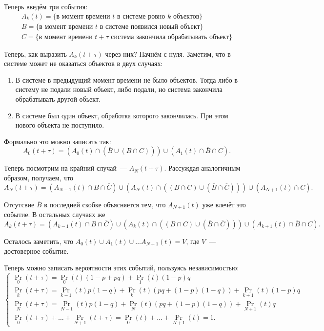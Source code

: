 Теперь введём три события:
\begin{gather}
	A_{k}(t) = \{\text{в момент времени } t \text{ в системе ровно } k \text{ 
	объектов}\} \\
	B = \{\text{в момент времени } t \text{ в системе появился новый объект}\} 
	\\
	C = \{\text{в момент времени } t + \tau \text{ система закончила 
	обрабатывать объект}\}
\end{gather}

Теперь, как выразить \(A_{k}(t + \tau)\) через них? Начнём с нуля. Заметим, что 
в системе может не оказаться объектов в двух случаях:
\begin{enumerate}
	\item В системе в предыдущий момент времени не было объектов. Тогда либо в 
	систему не подали новый объект, либо подали, но система закончила 
	обрабатывать другой обьект.
	\item В системе был один объект, обработка которого закончилась. При этом 
	нового объекта не поступило.
\end{enumerate} 
Формально это можно записать так:
\[
	A_{0}(t + \tau) = (A_{0}(t) \cap (\overline{B} \cup (B \cap C))) \cup 
	(A_{1}(t) \cap \overline{B} \cap C).
\]

Теперь посмотрим на крайний случай~--- \(A_{N}(t + \tau)\). Рассуждая 
аналогичным образом, получаем, что
\[
	A_{N}(t + \tau) = (A_{N - 1}(t) \cap B \cap \overline{C}) \cup (A_{N}(t) 
	\cap ((B \cap C) \cup (\overline{B} \cap \overline{C}))) \cup (A_{N + 1}(t) 
	\cap C).
\]

Отсутсвие \(\overline{B}\) в последней скобке объясняется тем, что \(A_{N + 
1}(t)\) уже влечёт это событие. В остальных случаях же
\[
	A_{k}(t + \tau) = (A_{k - 1}(t) \cap B \cap \overline{C}) \cup (A_{k}(t) 
	\cap ((B \cap C) \cup (\overline{B} \cap \overline{C}))) \cup (A_{k + 1}(t) 
	\cap \overline{B} \cap C).
\]

Осталось заметить, что \(A_{0}(t) \cup A_{1}(t) \cup \ldots A_{N + 1}(t) = V\), 
где \(V\)~--- достоверное событие.

Теперь можно записать вероятности этих событий, пользуясь независимостью:
\[
	\begin{cases}
	\Pr_{0}(t + \tau) = \Pr_{0}(t)(1 - p + pq) + \Pr_{1}(t)(1 - p)q \\
	\Pr_{k}(t + \tau) = \Pr_{k - 1}(t)p(1 - q) + \Pr_{k}(t)(pq + (1 - p)(1 - 
	q)) + \Pr_{k + 1}(t)(1 - p)q \\
	\Pr_{N}(t + \tau) = \Pr_{N - 1}(t)p(1 - q) + \Pr_{N}(t)(pq + (1 - p)(1 - 
	q)) + \Pr_{N + 1}(t)q \\
	\Pr_{0}(t + \tau) + \ldots + \Pr_{N + 1}(t + \tau) = \Pr_{0}(t) + \ldots + 
	\Pr_{N + 1}(t) = 1.
	\end{cases}
\]

